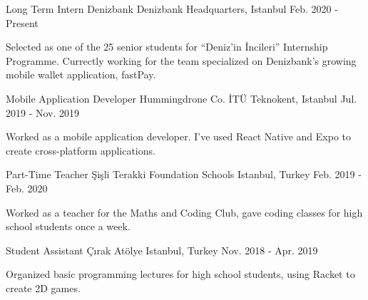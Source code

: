 

\begin{cventries}
\cventry
{Long Term Intern} %
{Denizbank} %
{Denizbank Headquarters, Istanbul} %
{Feb. 2020 - Present} %
{ %
\begin{cvitems}
\item {Selected as one of the 25 senior students for ``Deniz'in İncileri'' Internship Programme. Currectly working for the team specialized on Denizbank's growing mobile wallet application, fastPay.}
\end{cvitems}
}


\cventry
{Mobile Application Developer} %
{Hummingdrone Co.} %
{İTÜ Teknokent, Istanbul} %
{Jul. 2019 - Nov. 2019} %
{ %
\begin{cvitems}
\item {Worked as a mobile application developer. I've used React Native and Expo to create cross-platform applications.}
\end{cvitems}
}


\cventry
{Part-Time Teacher} %
{Şişli Terakki Foundation Schools} %
{Istanbul, Turkey} %
{Feb. 2019 - Feb. 2020} %
{ %
\begin{cvitems}
\item {Worked as a teacher for the Maths and Coding Club, gave coding classes for high school students once a week.}
\end{cvitems}
}


\cventry
{Student Assistant} %
{Çırak Atölye} %
{Istanbul, Turkey} %
{Nov. 2018 - Apr. 2019} %
{ %
\begin{cvitems}
\item {Organized basic programming lectures for high school students, using Racket to create 2D games.}
\end{cvitems}
}


\end{cventries}
